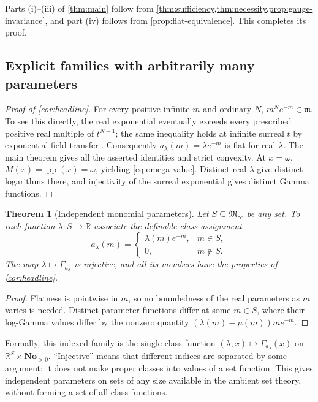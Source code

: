 \documentclass[11pt,letterpaper]{article}
\numberwithin{equation}{section}
\newtheorem{theorem}{Theorem}[section]
\theoremstyle{plain}
\theoremstyle{definition}
\theoremstyle{remark}
\newcommand{\No}{\mathbf{No}}
\newcommand{\R}{\mathbb R}
\newcommand{\mi}{\mathfrak m}
\newcommand{\Minf}{\mathfrak M_{\infty}}
\newcommand{\pp}{\operatorname{pp}}
\begin{document}
Parts (i)--(iii) of \cref{thm:main} follow from
\cref{thm:sufficiency,thm:necessity,prop:gauge-invariance}, and part (iv)
follows from \cref{prop:flat-equivalence}. This completes its proof.

\subsection{Explicit families with arbitrarily many parameters}
\begin{proof}[Proof of \cref{cor:headline}]
For every positive infinite $m$ and ordinary $N$,
$m^N e^{-m}\in\mi$. To see this directly, the real exponential eventually
exceeds every prescribed positive real multiple of $t^{N+1}$; the same
inequality holds at infinite surreal $t$ by exponential-field transfer
\cite{vdDE}. Consequently $a_\lambda(m)=\lambda e^{-m}$ is flat for
real $\lambda$. The main theorem gives all the asserted identities and
strict convexity. At $x=\omega$, $M(x)=\pp(x)=\omega$, yielding
\eqref{eq:omega-value}. Distinct real $\lambda$ give distinct logarithms
there, and injectivity of the surreal exponential gives distinct Gamma
functions.
\end{proof}

\begin{theorem}[Independent monomial parameters]\label{thm:independent}
Let $S\subseteq\Minf$ be any set. To each function
$\lambda:S\to\R$ associate the definable class assignment
\[
 a_\lambda(m)=
 \begin{cases}
 \lambda(m)e^{-m},&m\in S,\\
 0,&m\notin S.
 \end{cases}
\]
The map $\lambda\mapsto\Gamma_{a_\lambda}$ is injective, and all its
members have the properties of \cref{cor:headline}.
\end{theorem}
\begin{proof}
Flatness is pointwise in $m$, so no boundedness of the real parameters as
$m$ varies is needed. Distinct parameter functions differ at some $m\in S$,
where their log-Gamma values differ by the nonzero quantity
$(\lambda(m)-\mu(m))m e^{-m}$.
\end{proof}

Formally, this indexed family is the single class function
$(\lambda,x)\mapsto\Gamma_{a_\lambda}(x)$ on
$\R^S\times\No_{>0}$. ``Injective'' means that different indices are
separated by some argument; it does not make proper classes into values of
a set function. This gives independent parameters on sets of any size
available in the ambient set theory, without forming a set of all class
functions.
\end{document}
